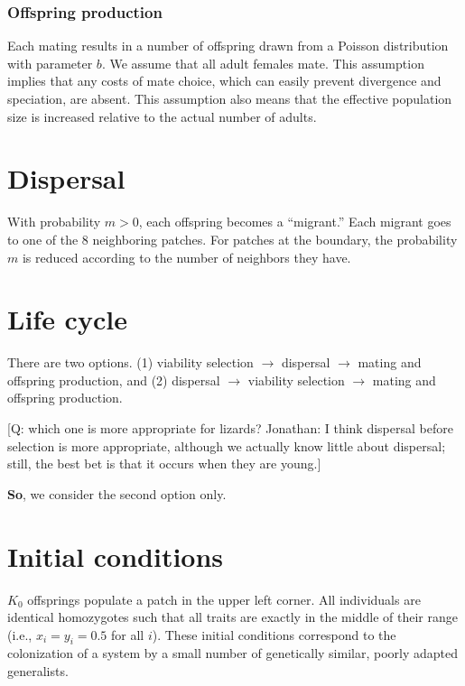\documentclass{article}
\begin{document}
\subsubsection{Offspring production}

Each mating results in a number of offspring drawn from a Poisson distribution with parameter $b$.
We assume that all adult females mate. This assumption implies that any costs of mate choice,
which can easily prevent divergence and speciation, are absent.
This assumption also means that the effective population size is increased relative to the actual
number of adults. 


\section{Dispersal}

With probability $m>0$, each offspring becomes a ``migrant.''
Each migrant goes to one of the 8 neighboring patches.
For patches at the boundary, the probability $m$ is reduced according to the number of neighbors they have.


\section{Life cycle}

There are two options. (1) viability selection $\rightarrow$ dispersal
$\rightarrow$ mating and offspring production, and (2) dispersal
$\rightarrow$ viability selection $\rightarrow$ mating and offspring production.

{\footnotesize [Q: which one is more appropriate for lizards?
Jonathan: I think dispersal before selection is more appropriate,
although we actually know little about dispersal;
still, the best bet is that it occurs when they are young.]}

{\bf So}, we consider the second option only.


\section{Initial conditions}

$K_0$ offsprings populate a patch in the upper left corner.
All individuals are identical homozygotes such that all traits are exactly in the middle of their range (i.e., $x_i=y_i=0.5$ for all $i$).
These initial conditions correspond to the colonization of a system by a small number of genetically similar, poorly adapted generalists.
\end{document}
